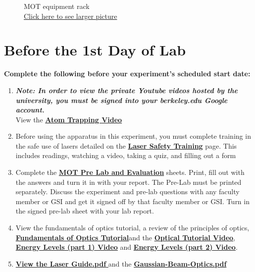 \documentclass{../lab}
\begin{document}
\begin{figure}[H]
  \caption{MOT equipment rack\\ \href{http://dev-physicsadv.pantheon.berkeley.edu/sites/default/files/IMG_4086.JPG}{Click here to see larger picture}}\label{fig:IMG_4086.JPG}
\endminipage
\end{figure}

\section{Before the 1st Day of Lab}

\textbf{Complete the following before your experiment's scheduled start date:}

\begin{enumerate}
    \item \emph{\textbf{Note: In order to view the private Youtube videos hosted by the university, you must be signed into your berkeley.edu Google account.}}\\
    View the \href{http://youtu.be/1n4QumeydQ4}{\textbf{Atom Trapping Video}}

    \item Before using the apparatus in this experiment, you must complete training in the safe use of lasers detailed on the \href{http://experimentationlab.berkeley.edu/LaserSafety}{\textbf{Laser Safety Training}} page. This includes readings, watching a video, taking a quiz, and filling out a form

    \item Complete the \href{http://experimentationlab.berkeley.edu/MOTPreLab}{\textbf{MOT Pre Lab and Evaluation}} sheets. Print, fill out with the answers and turn it in with your report. The Pre-Lab must be printed separately. Discuss the experiment and pre-lab questions with any faculty member or GSI and get it signed off by that faculty member or GSI. Turn in the signed pre-lab sheet with your lab report.

    \item View the fundamentals of optics tutorial, a review of the principles of optics,\textbf{ }\href{http://experimentationlab.berkeley.edu/sites/default/files/QIE/fundamental-Optics.pdf}{\textbf{\textbf{Fundamentals of Optics Tutorial}}}and the \href{http://youtu.be/zUGBt5vc5FA}{\textbf{Optical Tutorial Video}}, \href{http://youtu.be/wyBOVjU5bBQ}{\textbf{Energy Levels (part 1) Video}} and \href{http://youtu.be/Eypw0DmVBxk}{\textbf{Energy Levels (part 2) Video}}.

    \item \href{http://experimentationlab.berkeley.edu/sites/default/files/MOT/Laser-Guide.pdf}{\textbf{\textbf{View the Laser Guide.pdf }}}and the \href{http://experimentationlab.berkeley.edu/sites/default/files/MOT/Gaussian-Beam-Optics.pdf}{\textbf{Gaussian-Beam-Optics.pdf}}


\end{enumerate}
\end{document}
